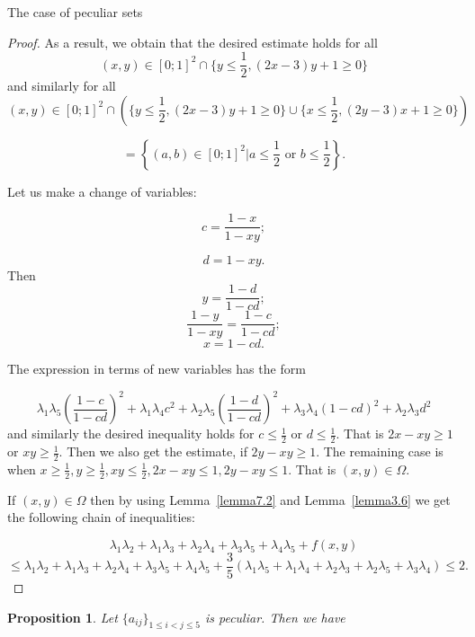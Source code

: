\documentclass[12pt]{article}
\newtheorem{proposition}{Proposition}[section]
\begin{document}
\begin{section}{The case of peculiar sets}
\begin{proof}
        As a result, we obtain that the desired estimate holds for all $$
            (x,y) \in [0;1]^{2}\cap \{ y\leq \frac{1}{2}, (2x-3)y+1\geq0\} 
        $$
        and similarly for all 
        $$
            (x,y) \in [0;1]^{2}\cap \left(\{ y\leq \frac{1}{2}, (2x-3)y+1\geq0\}\cup \{ x\leq \frac{1}{2}, (2y-3)x+1\geq0\}\right) $$
            
            $$= \left\{(a,b)\in[0;1]^{2} | a\leq \frac{1}{2} \text{ or } b\leq \frac{1}{2} \right\}.
        $$

        Let us make a change of variables:

        $$
            c  = \frac{1-x}{1-xy};
        $$

        $$
            d  = 1-xy.
        $$
        Then  
        $$
            y = \frac{1-d}{1-cd};
        $$
        $$
            \frac{1-y}{1-xy} = \frac{1-c}{1-cd};
        $$
        $$
            x = 1- cd.
        $$

        The expression in terms of new variables has the form

         $$
            \lambda_{1}\lambda_{5}\left(\frac{1-c}{1-cd}\right)^2 + \lambda_{1}\lambda_{4} c^2 + \lambda_{2}\lambda_{5}\left(\frac{1-d}{1-cd}\right)^2 + \lambda_{3}\lambda_{4}(1-cd)^{2} + \lambda_{2}\lambda_{3}d^2
        $$
        and similarly the desired inequality holds for $c\leq \frac{1}{2}$ or $d\leq \frac{1}{2}$. That is $2x - xy \geq 1$ or $xy\geq \frac{1}{2}$.  Then we also get the estimate,  if $2y-xy\geq 1$.  The remaining case is when $x\geq \frac{1}{2}, y\geq \frac{1}{2}, xy\leq \frac{1}{2}, 2x-xy\leq 1, 2y-xy\leq 1$. That is $(x,y)\in \Omega.$

        If $(x,y)\in\Omega$ then by using Lemma~\ref{lemma7.2} and Lemma~\ref{lemma3.6} we get the following chain of inequalities:

        $$
            \lambda_{1}\lambda_{2} + \lambda_{1}\lambda_{3} +  \lambda_{2}\lambda_{4} + \lambda_{3}\lambda_{5} + \lambda_{4}\lambda_{5} + f(x,y) 
        $$
        $$
            \leq   \lambda_{1}\lambda_{2} + \lambda_{1}\lambda_{3} + \lambda_{2}\lambda_{4} +\lambda_{3}\lambda_{5} + \lambda_{4}\lambda_{5} + \frac{3}{5}(\lambda_{1}\lambda_{5} + \lambda_{1}\lambda_{4} +\lambda_{2}\lambda_{3} + \lambda_{2}\lambda_{5} + \lambda_{3}\lambda_{4} ) \leq 2.
        $$  
        
    \end{proof}
    
    \begin{proposition}
    \label{bad-case}
        Let  $\{a_{ij}\}_{1\leq i<j\leq 5}$ is peculiar. Then we have
    

\end{proposition}
\end{section}
\end{document}
